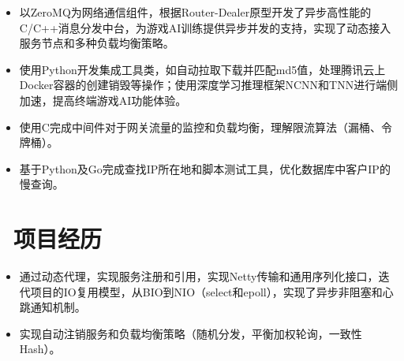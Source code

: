 \documentclass{resume}
\begin{document}
\vspace{-0.5ex}
\begin{onehalfspacing}
\begin{itemize}
  \item 以ZeroMQ为网络通信组件，根据Router-Dealer原型开发了异步高性能的C/C++消息分发中台，为游戏AI训练提供异步并发的支持，实现了动态接入服务节点和多种负载均衡策略。
  \item 使用Python开发集成工具类，如自动拉取下载并匹配md5值，处理腾讯云上Docker容器的创建销毁等操作；使用深度学习推理框架NCNN和TNN进行端侧加速，提高终端游戏AI功能体验。
\end{itemize}
\end{onehalfspacing}

\vspace{-0.5ex}
\begin{onehalfspacing}
\begin{itemize}
  \item 使用C完成中间件对于网关流量的监控和负载均衡，理解限流算法（漏桶、令牌桶）。
  \item 基于Python及Go完成查找IP所在地和脚本测试工具，优化数据库中客户IP的慢查询。
\end{itemize}
\end{onehalfspacing}

\section{\faUsers\ 项目经历}
\vspace{-0.5ex}
\begin{onehalfspacing}
\begin{itemize}
  \item 通过动态代理，实现服务注册和引用，实现Netty传输和通用序列化接口，迭代项目的IO复用模型，从BIO到NIO（select和epoll），实现了异步非阻塞和心跳通知机制。
  \item 实现自动注销服务和负载均衡策略（随机分发，平衡加权轮询，一致性Hash）。
\end{itemize}
\end{onehalfspacing}
\end{document}

